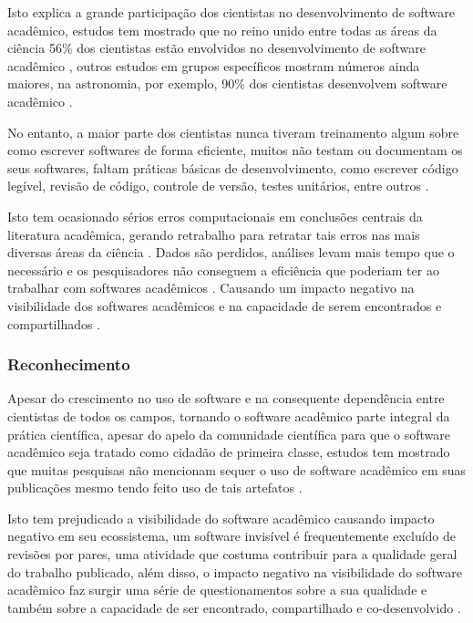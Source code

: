 Isto explica a grande participação dos cientistas no desenvolvimento de
software acadêmico, estudos tem mostrado que no reino unido entre todas as
áreas da ciência 56\% dos cientistas estão envolvidos no desenvolvimento de
software acadêmico \cite{hettrick2014uk}, outros estudos em grupos específicos mostram números ainda
maiores, na astronomia, por exemplo, 90\% dos cientistas desenvolvem software
acadêmico \cite{momcheva2015software}.

No entanto, a maior parte dos cientistas nunca tiveram treinamento algum sobre como escrever
softwares de forma eficiente, muitos não testam ou documentam os seus
softwares, faltam práticas básicas de desenvolvimento, como escrever código
legível, revisão de código, controle de versão, testes unitários, entre outros
\cite{wilson2017good}.

Isto tem ocasionado sérios erros computacionais em conclusões centrais da
literatura acadêmica, gerando retrabalho para retratar tais erros nas mais
diversas áreas da ciência \cite{Merali2010Computational}.
Dados são perdidos, análises levam mais tempo que o necessário e os
pesquisadores não conseguem a eficiência que poderiam ter ao trabalhar com
softwares acadêmicos \cite{wilson2017good}.
Causando um impacto negativo na visibilidade dos softwares acadêmicos e na
capacidade de serem encontrados e compartilhados \cite{howison2013,
katz2014transitive}.

\subsubsection{Reconhecimento}


Apesar do crescimento no uso de software e na consequente dependência entre
cientistas de todos os campos, tornando o software acadêmico parte integral da
prática científica, apesar do apelo da comunidade científica para que o
software acadêmico seja tratado como cidadão de primeira classe, estudos tem
mostrado que muitas pesquisas não mencionam sequer o uso de software acadêmico
em suas publicações mesmo tendo feito uso de tais artefatos
\cite{momcheva2015software} \cite{howison2016software}.

Isto tem prejudicado a visibilidade do software acadêmico causando impacto
negativo em seu ecossistema, um software invisível é frequentemente excluído de
revisões por pares, uma atividade que costuma contribuir para a qualidade geral
do trabalho publicado, além disso, o
impacto negativo na visibilidade do software acadêmico faz surgir uma
série de questionamentos sobre a sua qualidade e também sobre a
capacidade de ser encontrado, compartilhado e co-desenvolvido
\cite{howison2013, katz2014transitive} \cite{howison2016software}.

